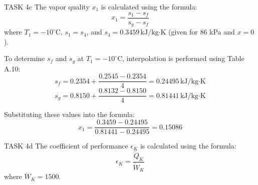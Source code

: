 TASK 4c  
The vapor quality \( x_1 \) is calculated using the formula:  
\[
x_1 = \frac{s_1 - s_f}{s_g - s_f}
\]  
where \( T_1 = -10^\circ\text{C} \), \( s_1 = s_4 \), and \( s_4 = 0.3459 \, \text{kJ/kg·K} \) (given for 86 kPa and \( x = 0 \)).

To determine \( s_f \) and \( s_g \) at \( T_1 = -10^\circ\text{C} \), interpolation is performed using Table A.10:  
\[
s_f = 0.2354 + \frac{0.2545 - 0.2354}{4} = 0.24495 \, \text{kJ/kg·K}
\]  
\[
s_g = 0.8150 + \frac{0.8132 - 0.8150}{4} = 0.81441 \, \text{kJ/kg·K}
\]  

Substituting these values into the formula:  
\[
x_1 = \frac{0.3459 - 0.24495}{0.81441 - 0.24495} = 0.15086
\]  

TASK 4d  
The coefficient of performance \( \epsilon_K \) is calculated using the formula:  
\[
\epsilon_K = \frac{\dot{Q}_K}{\dot{W}_K}
\]  
where \( \dot{W}_K = 1500 \).